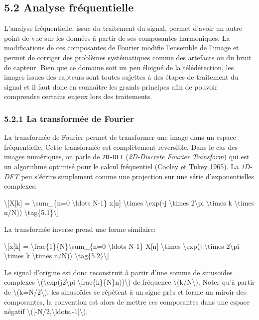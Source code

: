 \documentclass[
]{article}
\begin{document}
\subsection{\texorpdfstring{{5.2} Analyse
fréquentielle}{5.2 Analyse fréquentielle}}\label{analyse-fruxe9quentielle}

L'analyse fréquentielle, issue du traitement du signal, permet d'avoir
un autre point de vue sur les données à partir de ses composantes
harmoniques. La modifications de ces composantes de Fourier modifie
l'ensemble de l'image et permet de corriger des problèmes systématiques
comme des artefacts ou du bruit de capteur. Bien que ce domaine soit un
peu éloigné de la télédétection, les images issues des capteurs sont
toutes sujettes à des étapes de traitement du signal et il faut donc en
connaître les grands principes afin de pouvoir comprendre certains
enjeux lors des traitements.

\subsubsection{\texorpdfstring{{5.2.1} La transformée de
Fourier}{5.2.1 La transformée de Fourier}}\label{la-transformuxe9e-de-fourier}

La transformée de Fourier permet de transformer une image dans un espace
fréquentielle. Cette transformée est complètement reversible. Dans le
cas des images numériques, on parle de \texttt{2D-DFT}
(\emph{2D-Discrete Fourier Transform}) qui est un algorithme optimisé
pour le calcul fréquentiel
{(\href{references.html\#ref-Cooley-1965}{Cooley et Tukey 1965})}. La
\emph{1D-DFT} peu s'écrire simplement comme une projection sur une série
d'exponentielles complexes:

\label{eq-dft}{{\textbackslash{[}X{[}k{]} =
\textbackslash sum\_\{n=0 \textbackslash ldots N-1\} x{[}n{]}
\textbackslash times \textbackslash exp(-j \textbackslash times
2\textbackslash pi \textbackslash times k \textbackslash times n/N))
\textbackslash tag\{5.1\}\textbackslash{]}}}

La transformée inverse prend une forme similaire:

\label{eq-idft}{{\textbackslash{[}x{[}k{]} =
\textbackslash frac\{1\}\{N\}\textbackslash sum\_\{n=0
\textbackslash ldots N-1\} X{[}n{]} \textbackslash times
\textbackslash exp(j \textbackslash times 2\textbackslash pi
\textbackslash times k \textbackslash times n/N))
\textbackslash tag\{5.2\}\textbackslash{]}}}

Le signal d'origine est donc reconstruit à partir d'une somme de
sinusoïdes complexes
{\textbackslash(\textbackslash exp(j2\textbackslash pi
\textbackslash frac\{k\}\{N\}n))\textbackslash)} de fréquence
{\textbackslash(k/N\textbackslash)}. Noter qu'à partir de
{\textbackslash(k=N/2\textbackslash)}, les sinusoïdes se répètent à un
signe près et forme un miroir des composantes, la convention est alors
de mettre ces composantes dans une espace négatif
{\textbackslash({[}-N/2,\textbackslash ldots,-1{]}\textbackslash)}.
\end{document}
